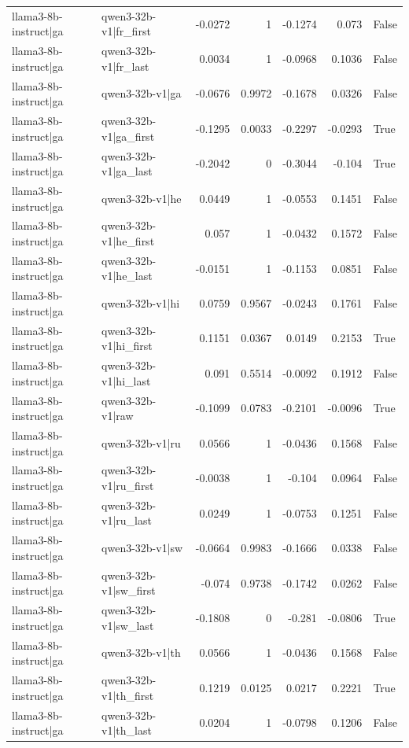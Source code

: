 \begin{table}
\begin{tabular}{l l r r r r l}
llama3-8b-instruct|ga & qwen3-32b-v1|fr_first & -0.0272 & 1 & -0.1274 & 0.073 & False \\
llama3-8b-instruct|ga & qwen3-32b-v1|fr_last & 0.0034 & 1 & -0.0968 & 0.1036 & False \\
llama3-8b-instruct|ga & qwen3-32b-v1|ga & -0.0676 & 0.9972 & -0.1678 & 0.0326 & False \\
llama3-8b-instruct|ga & qwen3-32b-v1|ga_first & -0.1295 & 0.0033 & -0.2297 & -0.0293 & True \\
llama3-8b-instruct|ga & qwen3-32b-v1|ga_last & -0.2042 & 0 & -0.3044 & -0.104 & True \\
llama3-8b-instruct|ga & qwen3-32b-v1|he & 0.0449 & 1 & -0.0553 & 0.1451 & False \\
llama3-8b-instruct|ga & qwen3-32b-v1|he_first & 0.057 & 1 & -0.0432 & 0.1572 & False \\
llama3-8b-instruct|ga & qwen3-32b-v1|he_last & -0.0151 & 1 & -0.1153 & 0.0851 & False \\
llama3-8b-instruct|ga & qwen3-32b-v1|hi & 0.0759 & 0.9567 & -0.0243 & 0.1761 & False \\
llama3-8b-instruct|ga & qwen3-32b-v1|hi_first & 0.1151 & 0.0367 & 0.0149 & 0.2153 & True \\
llama3-8b-instruct|ga & qwen3-32b-v1|hi_last & 0.091 & 0.5514 & -0.0092 & 0.1912 & False \\
llama3-8b-instruct|ga & qwen3-32b-v1|raw & -0.1099 & 0.0783 & -0.2101 & -0.0096 & True \\
llama3-8b-instruct|ga & qwen3-32b-v1|ru & 0.0566 & 1 & -0.0436 & 0.1568 & False \\
llama3-8b-instruct|ga & qwen3-32b-v1|ru_first & -0.0038 & 1 & -0.104 & 0.0964 & False \\
llama3-8b-instruct|ga & qwen3-32b-v1|ru_last & 0.0249 & 1 & -0.0753 & 0.1251 & False \\
llama3-8b-instruct|ga & qwen3-32b-v1|sw & -0.0664 & 0.9983 & -0.1666 & 0.0338 & False \\
llama3-8b-instruct|ga & qwen3-32b-v1|sw_first & -0.074 & 0.9738 & -0.1742 & 0.0262 & False \\
llama3-8b-instruct|ga & qwen3-32b-v1|sw_last & -0.1808 & 0 & -0.281 & -0.0806 & True \\
llama3-8b-instruct|ga & qwen3-32b-v1|th & 0.0566 & 1 & -0.0436 & 0.1568 & False \\
llama3-8b-instruct|ga & qwen3-32b-v1|th_first & 0.1219 & 0.0125 & 0.0217 & 0.2221 & True \\
llama3-8b-instruct|ga & qwen3-32b-v1|th_last & 0.0204 & 1 & -0.0798 & 0.1206 & False \\

\end{tabular}
\end{table}
